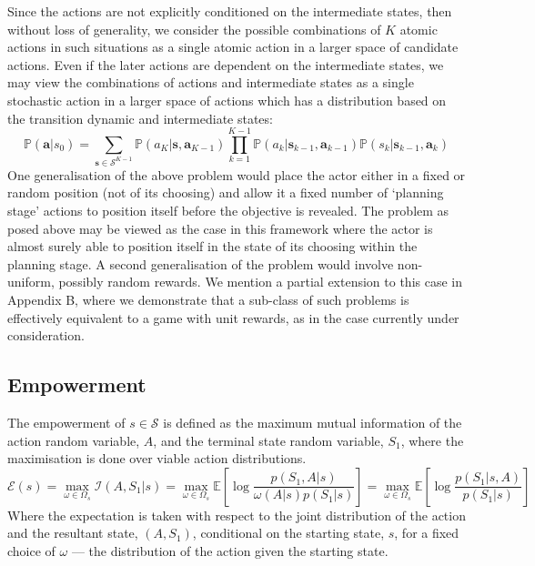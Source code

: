 \documentclass{article}
\newcommand{\EE}{\mathbb{E}}
\newcommand{\PP}{\mathbb{P}}
\newcommand{\Ss}{\mathcal{S}}
\newcommand{\Ii}{\mathcal{I}}
\newcommand{\Ee}{\mathcal{E}}
\begin{document}
Since the actions are not explicitly conditioned on the intermediate states, then without loss of generality, we consider the possible combinations of $K$ atomic actions in such situations as a single atomic action in a larger space of candidate actions.
Even if the later actions are dependent on the intermediate states, we may view the combinations of actions and intermediate states as a single stochastic action in a larger space of actions which has a distribution based on the transition dynamic and intermediate states:
\[\PP(\mathbf{a}|s_0) = \sum_{\mathbf{s}\in \Ss^{K-1}} \PP(a_K|\mathbf{s},\mathbf{a}_{K-1}) \prod_{k=1}^{K-1} \PP(a_k|\mathbf{s}_{k-1},\mathbf{a}_{k-1})\PP(s_{k}|\mathbf{s}_{k-1},\mathbf{a}_k)\]
One generalisation of the above problem would place the actor either in a fixed or random position (not of its choosing) and allow it a fixed number of `planning stage' actions to position itself before the objective is revealed. 
The problem as posed above may be viewed as the case in this framework where the actor is almost surely able to position itself in the state of its choosing within the planning stage.
A second generalisation of the problem would involve non-uniform, possibly random rewards. We mention a partial extension to this case in Appendix B, where we demonstrate that a sub-class of such problems is effectively equivalent to a game with unit rewards, as in the case currently under consideration. 

\subsection{Empowerment}
The empowerment of $s\in\mathcal{S}$ is defined as the maximum mutual information of the action random variable, $A$, and the terminal state random variable, $S_1$, where the maximisation is done over viable action distributions.
\[\Ee(s)=\max_{\omega\in\Omega_s}\Ii(A,S_1|s)=\max_{\omega\in\Omega_s}\EE\left[\log\frac{p(S_1,A|s)}{\omega(A|s)p(S_1|s)}\right]=\max_{\omega\in\Omega_s}\EE\left[\log\frac{p(S_1|s,A)}{p(S_1|s)}\right] \]
Where the expectation is taken with respect to the joint distribution of the action and the resultant state, $(A,S_1)$, conditional on the starting state, $s$, for a fixed choice of $\omega$ --- the distribution of the action given the starting state. 
\end{document}
